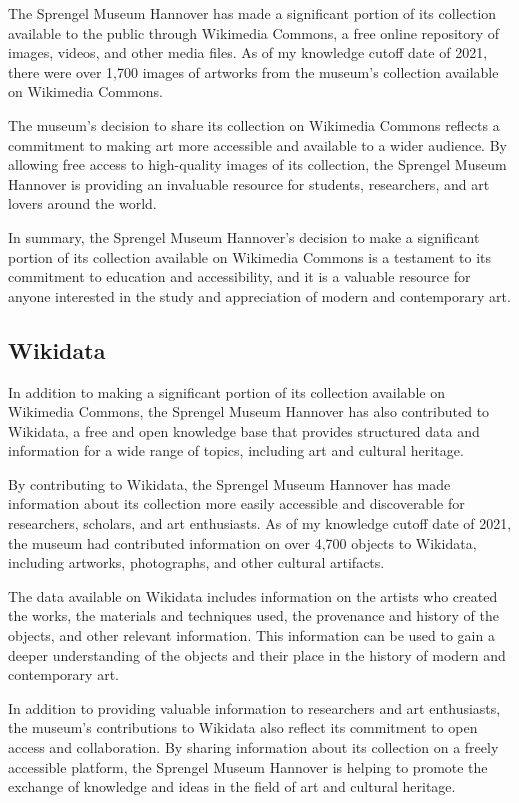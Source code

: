 \documentclass[
  letterpaper,
]{book}
\begin{document}
The Sprengel Museum Hannover has made a significant portion of its
collection available to the public through Wikimedia Commons, a free
online repository of images, videos, and other media files. As of my
knowledge cutoff date of 2021, there were over 1,700 images of artworks
from the museum's collection available on Wikimedia Commons.

The museum's decision to share its collection on Wikimedia Commons
reflects a commitment to making art more accessible and available to a
wider audience. By allowing free access to high-quality images of its
collection, the Sprengel Museum Hannover is providing an invaluable
resource for students, researchers, and art lovers around the world.

In summary, the Sprengel Museum Hannover's decision to make a
significant portion of its collection available on Wikimedia Commons is
a testament to its commitment to education and accessibility, and it is
a valuable resource for anyone interested in the study and appreciation
of modern and contemporary art.

\hypertarget{wikidata}{%
\subsection{Wikidata}\label{wikidata}}

In addition to making a significant portion of its collection available
on Wikimedia Commons, the Sprengel Museum Hannover has also contributed
to Wikidata, a free and open knowledge base that provides structured
data and information for a wide range of topics, including art and
cultural heritage.

By contributing to Wikidata, the Sprengel Museum Hannover has made
information about its collection more easily accessible and discoverable
for researchers, scholars, and art enthusiasts. As of my knowledge
cutoff date of 2021, the museum had contributed information on over
4,700 objects to Wikidata, including artworks, photographs, and other
cultural artifacts.

The data available on Wikidata includes information on the artists who
created the works, the materials and techniques used, the provenance and
history of the objects, and other relevant information. This information
can be used to gain a deeper understanding of the objects and their
place in the history of modern and contemporary art.

In addition to providing valuable information to researchers and art
enthusiasts, the museum's contributions to Wikidata also reflect its
commitment to open access and collaboration. By sharing information
about its collection on a freely accessible platform, the Sprengel
Museum Hannover is helping to promote the exchange of knowledge and
ideas in the field of art and cultural heritage.
\end{document}

